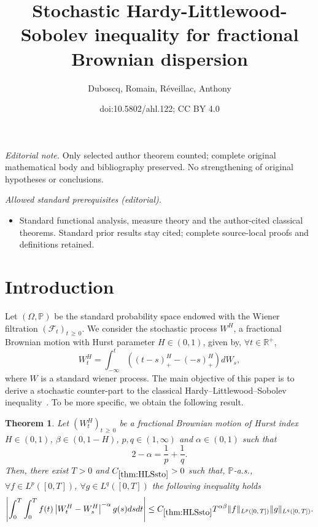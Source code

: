 \documentclass[10pt]{amsart}
\title{Stochastic Hardy-Littlewood-Sobolev inequality for fractional Brownian dispersion}
\author{Duboscq, Romain, Réveillac, Anthony}
\date{doi:10.5802/ahl.122; CC BY 4.0}
\newtheorem{theo}{Theorem}[section]
\theoremstyle{definition}\newtheorem{defi}[theo]{Definition}\newtheorem{rema}[theo]{Remark}\newtheorem{exam}[theo]{Example}\newtheorem{exem}[theo]{Example}\newtheorem{nota}[theo]{Notation}
\newcommand{\bbP}{\mathbb{P}}
\newcommand{\bbR}{\mathbb{R}}
\newcommand{\clF}{\mathcal{F}}
\let\oldforall\forall
\renewcommand*{\forall}{\mathrel{\oldforall}}
\begin{document}
\maketitle
\noindent\textit{Editorial note.} Only selected author theorem counted; complete original mathematical body and bibliography preserved. No strengthening of original hypotheses or conclusions.\par\medskip
\noindent\textit{Allowed standard prerequisites (editorial).}\begin{itemize}
\item Standard functional analysis, measure theory and the author-cited classical theorems. Standard prior results stay cited; complete source-local proofs and definitions retained.
\end{itemize}\medskip

\section{Introduction}

Let $(\Omega, \bbP)$ be the standard probability space endowed with the Wiener filtration $(\clF_t)_{t\,\geq\,0}$. We consider the stochastic process $W^H$, a fractional Brownian motion with Hurst parameter $H\in(0,1)$, given by, $\forall t\in\bbR^+$,
\[
W^H_t = \int_{-\infty}^t\left((t-s)_+^{H}-(-s)_+^{H}\right)dW_s,
\]
where $W$ is a standard wiener process. The main objective of this paper is to derive a stochastic counter-part to the classical Hardy--Littlewood--Sobolev inequality~\cite{hardy1928some,hardy1932some,sobolev1938theorem}. To be more specific, we obtain the following result.


\begin{theo}\label{thm:HLSsto}
Let $(W^H_t)_{t\,\geq\,0}$ be a fractional Brownian motion of Hurst index $H\in (0,1)$, $\beta\in (0,1-H)$, $p,q \in (1,\infty)$ and $\alpha\in (0,1)$ such that
\[
2 - \alpha = \frac1p+\frac1q.
\]
Then, there exist $T>0$ and $C_{\ref{thm:HLSsto}}>0$ such that, $\bbP$-a.s., $\forall f\in L^p([0,T])$, $\forall g\in L^q([0,T])$ the following inequality holds
\begin{equation}\label{ineq:HLSsto}
\left|\int_0^T\int_0^T f(t)\left|W^{H}_t-W^{H}_s\right|^{-\alpha}g(s) ds dt\right|\leq C_{\ref{thm:HLSsto}} T^{\alpha\beta}\|f\|_{L^p\left([0,\,T]\right)}\|g\|_{L^q\left([0,\,T]\right)}.
\end{equation}
\end{theo}
\end{document}

